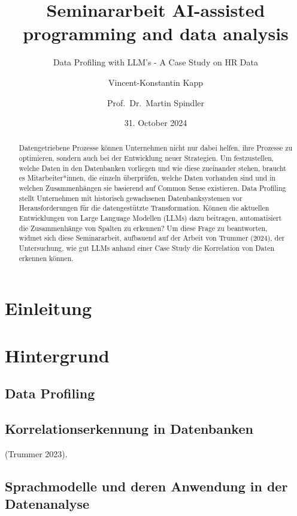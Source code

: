 \documentclass[
  11pt,
]{article}
\title{Seminararbeit AI-assisted programming and data analysis}
\subtitle{Data Profiling with LLM's - A Case Study on HR Data}
\author{Vincent-Konstantin Kapp \and Prof.~Dr.~Martin Spindler}
\date{31. October 2024}
\begin{document}
\maketitle
\begin{abstract}
Datengetriebene Prozesse können Unternehmen nicht nur dabei helfen, ihre
Prozesse zu optimieren, sondern auch bei der Entwicklung neuer
Strategien. Um festzustellen, welche Daten in den Datenbanken vorliegen
und wie diese zueinander stehen, braucht es Mitarbeiter*innen, die
einzeln überprüfen, welche Daten vorhanden sind und in welchen
Zusammenhängen sie basierend auf Common Sense existieren. Data Profiling
stellt Unternehmen mit historisch gewachsenen Datenbanksystemen vor
Herausforderungen für die datengestützte Transformation. Können die
aktuellen Entwicklungen von Large Language Modellen (LLMs) dazu
beitragen, automatisiert die Zusammenhänge von Spalten zu erkennen? Um
diese Frage zu beantworten, widmet sich diese Seminararbeit, aufbauend
auf der Arbeit von Trummer (2024), der Untersuchung, wie gut LLMs anhand
einer Case Study die Korrelation von Daten erkennen können.
\end{abstract}

\section{Einleitung}\label{einleitung}

\section{Hintergrund}\label{hintergrund}

\subsection{Data Profiling}\label{data-profiling}

\subsection{Korrelationserkennung in
Datenbanken}\label{korrelationserkennung-in-datenbanken}

(Trummer 2023).

\subsection{Sprachmodelle und deren Anwendung in der
Datenanalyse}\label{sprachmodelle-und-deren-anwendung-in-der-datenanalyse}
\end{document}
